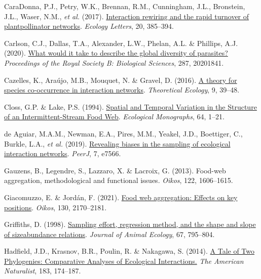\documentclass[11pt]{article}
\newlength{\cslhangindent}
\newenvironment{CSLReferences}[3] %
 {%
  \setlength{\parindent}{0pt}
  \ifodd #1 \everypar{\setlength{\hangindent}{\cslhangindent}}\ignorespaces\fi
  \ifnum #2 > 0
  \setlength{\parskip}{#2\baselineskip}
  \fi
 }%
 {}
\begin{document}
\begin{CSLReferences}{1}{0}
\leavevmode{}%
CaraDonna, P.J., Petry, W.K., Brennan, R.M., Cunningham, J.L.,
Bronstein, J.L., Waser, N.M., \emph{et al.} (2017).
\href{https://doi.org/10.1111/ele.12740}{Interaction rewiring and the
rapid turnover of plantpollinator networks}. \emph{Ecology Letters}, 20,
385--394.

\leavevmode{}%
Carlson, C.J., Dallas, T.A., Alexander, L.W., Phelan, A.L. \& Phillips,
A.J. (2020). \href{https://doi.org/10.1098/rspb.2020.1841}{What would it
take to describe the global diversity of parasites?} \emph{Proceedings
of the Royal Society B: Biological Sciences}, 287, 20201841.

\leavevmode{}%
Cazelles, K., Araújo, M.B., Mouquet, N. \& Gravel, D. (2016).
\href{https://doi.org/10.1007/s12080-015-0281-9}{A theory for species
co-occurrence in interaction networks}. \emph{Theoretical Ecology}, 9,
39--48.

\leavevmode{}%
Closs, G.P. \& Lake, P.S. (1994).
\href{https://doi.org/10.2307/2937053}{Spatial and Temporal Variation in
the Structure of an Intermittent-Stream Food Web}. \emph{Ecological
Monographs}, 64, 1--21.

\leavevmode{}%
de Aguiar, M.A.M., Newman, E.A., Pires, M.M., Yeakel, J.D., Boettiger,
C., Burkle, L.A., \emph{et al.} (2019).
\href{https://doi.org/10.7717/peerj.7566}{Revealing biases in the
sampling of ecological interaction networks}. \emph{PeerJ}, 7, e7566.

\leavevmode{}%
Gauzens, B., Legendre, S., Lazzaro, X. \& Lacroix, G. (2013). Food-web
aggregation, methodological and functional issues. \emph{Oikos}, 122,
1606--1615.

\leavevmode{}%
Giacomuzzo, E. \& Jordán, F. (2021).
\href{https://doi.org/10.1111/oik.08541}{Food web aggregation: Effects
on key positions}. \emph{Oikos}, 130, 2170--2181.

\leavevmode{}%
Griffiths, D. (1998).
\href{https://doi.org/10.1046/j.1365-2656.1998.00244.x}{Sampling effort,
regression method, and the shape and slope of sizeabundance relations}.
\emph{Journal of Animal Ecology}, 67, 795--804.

\leavevmode{}%
Hadfield, J.D., Krasnov, B.R., Poulin, R. \& Nakagawa, S. (2014).
\href{https://doi.org/10.1086/674445}{A Tale of Two Phylogenies:
Comparative Analyses of Ecological Interactions.} \emph{The American
Naturalist}, 183, 174--187.


\end{CSLReferences}
\end{document}
